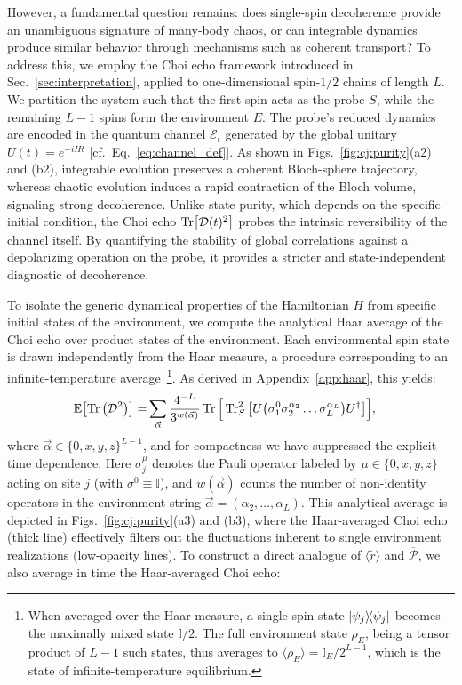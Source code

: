 \documentclass[pra,twocolumn,aps,showpacs,superscriptaddress,longbibliography]{revtex4-2}%
\begin{document}
However, a fundamental question remains: does single-spin decoherence provide an unambiguous signature of many-body chaos, or can integrable dynamics produce similar behavior through mechanisms such as coherent transport? To address this, we employ the Choi echo framework introduced in Sec.~\ref{sec:interpretation}, applied to one-dimensional spin-$1/2$ chains of length $L$. We partition the system such that the first spin acts as the probe $S$, while the remaining $L-1$ spins form the environment $E$. The probe’s reduced dynamics are encoded in the quantum channel $\mathcal{E}_t$ generated by the global unitary $U(t)=e^{-iHt}$ [cf.~Eq.~\eqref{eq:channel_def}]. As shown in Figs.~\ref{fig:cj:purity}(a2) and (b2), integrable evolution preserves a coherent Bloch-sphere trajectory, whereas chaotic evolution induces a rapid contraction of the Bloch volume, signaling strong decoherence. Unlike state purity, which depends on the specific initial condition, the Choi echo $\Tr[\mathcal{D}(t)^2]$ probes the intrinsic reversibility of the channel itself. By quantifying the stability of global correlations against a depolarizing operation on the probe, it provides a stricter and state-independent diagnostic of decoherence.

To isolate the generic dynamical properties of the Hamiltonian $H$ from specific initial states of the environment, we compute the analytical Haar average of the Choi echo over product states of the environment. Each environmental spin state is drawn independently from the Haar measure, a procedure corresponding to an infinite-temperature average~\footnote{When averaged over the Haar measure, a single-spin state $\dyad{\psi_j}$ becomes the maximally mixed state $\mathbb{I}/2$. The full environment state $\rho_E$, being a tensor product of $L-1$ such states, thus averages to $\langle \rho_E \rangle = \mathbb{I}_E / 2^{L-1}$, which is the state of infinite-temperature equilibrium.}. As derived in Appendix~\ref{app:haar}, this yields:
\begin{align}\label{eq:haar:avg:choi}
\mathbb{E}\bqty{\Tr\pqty{\mathcal{D}^{2}}} =& 
\sum_{\vec{\alpha} }
  \frac{4^{-L}}{3^{w(\vec{\alpha})}}
\Tr \Big[ \Tr_S^2 \big[U
\qty(\sigma_1^0 \sigma_2^{\alpha_2} \ldots \sigma_L^{\alpha_L})
U^\dagger \big] \Big],
\end{align}
where $\vec{\alpha} \in \{0,x,y,z\}^{L-1}$, and for compactness we have  suppressed the explicit time dependence. Here $\sigma_j^\mu$ denotes the Pauli 
operator labeled by $\mu \in \{0,x,y,z\}$ acting on site $j$ (with $\sigma^0 \equiv \mathbb{I}$), 
and $w(\vec{\alpha})$ counts the number of non-identity operators in the 
environment string $\vec{\alpha} = (\alpha_2, \dots, \alpha_L)$. This analytical average is depicted in Figs.~\ref{fig:cj:purity}(a3) and (b3), where the Haar-averaged Choi echo (thick line) effectively filters out the fluctuations inherent to single environment realizations (low-opacity lines). To construct a direct analogue of $\langle \tilde{r} \rangle$ and $\overline{\mathcal{P}}$, we also average in time the Haar-averaged Choi echo:
\end{document}
